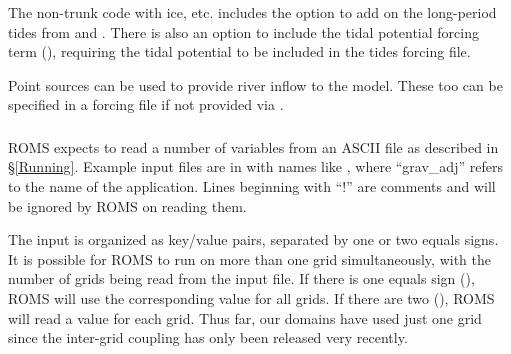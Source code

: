 The non-trunk code with ice, etc. includes the  option to
add on the long-period tides from
\cite{Foreman_96a} and \cite{Foreman_96b}.
There is also an option to include the tidal potential
forcing term (), requiring the tidal potential to
be included in the tides forcing file.

\smallskip
{}

Point sources can be used to provide river inflow to the model.
These too can be specified in a forcing file if not provided via
.

\subsubsection{}
\label{ASCII_in}
ROMS expects to read a number of variables from an ASCII file as described
in \S\ref{Running}.
Example input files are in  with names like
, where ``grav\_adj'' refers to the name of
the application. Lines beginning with ``!'' are comments and will be
ignored by ROMS on reading them.

The input is organized as key/value pairs, separated by one or two
equals signs. It is possible for ROMS to run on more than one grid
simultaneously, with the number of grids being read from the input
file. If there is one equals sign (\code{=}), ROMS will use the
corresponding value for all grids. If there are two (\code{==}), ROMS
will read a value for each grid. Thus far, our domains have used just
one grid since the inter-grid coupling has only been released very
recently.

